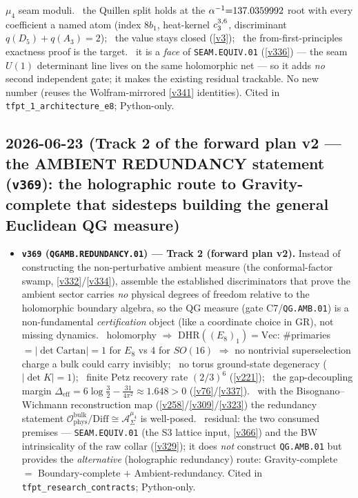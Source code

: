 \begin{itemize}
$\mu_4$ seam moduli. \mE\ the Quillen split holds at the $\alpha^{-1}{=}137.0359992$ root with every coefficient a named
atom (index $8b_1$, heat-kernel $c_3^{3,6}$, discriminant $q(D_5){+}q(A_3){=}2$); \mE\ the value stays closed
(\vref{v3}); \mO\ the from-first-principles exactness proof is the target. \mC\ it is a \emph{face} of
\texttt{SEAM.EQUIV.01} (\vref{v336}) --- the seam $U(1)$ determinant line lives on the same holomorphic net --- so it
adds \emph{no} second independent gate; it makes the existing residual trackable. No new number (reuses the
Wolfram-mirrored \vref{v341} identities). Cited in \texttt{tfpt\_1\_architecture\_e8}; Python-only.
\end{itemize}

\subsection*{2026-06-23 (Track 2 of the forward plan v2 --- the AMBIENT REDUNDANCY statement (\texttt{v369}): the holographic route to Gravity-complete that sidesteps building the general Euclidean QG measure)}
\begin{itemize}
\item \textbf{\texttt{v369} (\texttt{QGAMB.REDUNDANCY.01}) --- Track 2 (forward plan v2).} Instead of
constructing the non-perturbative ambient measure (the conformal-factor swamp, \vref{v332}/\vref{v334}), assemble
the established discriminators that prove the ambient sector carries \emph{no} physical degrees of freedom relative
to the holomorphic boundary algebra, so the QG measure (gate C7/\texttt{QG.AMB.01}) is a non-fundamental
\emph{certification} object (like a coordinate choice in GR), not missing dynamics. \mE\ holomorphy
$\Rightarrow$ $\mathrm{DHR}((E_8)_1)=\mathrm{Vec}$: $\#$primaries $=|\det\mathrm{Cartan}|=1$ for $E_8$ vs $4$ for
$SO(16)$ $\Rightarrow$ no nontrivial superselection charge a bulk could carry invisibly; \mE\ no torus
ground-state degeneracy ($|\det K|=1$); \mE\ finite Petz recovery rate $(2/3)^6$ (\vref{v221}); \mE\ the
gap-decoupling margin $\Delta_{\mathrm{eff}}=6\log\tfrac32-\tfrac{31}{4\pi^2}\approx1.648>0$ (\vref{v76}/\vref{v337}).
\mC\ with the Bisognano--Wichmann reconstruction map (\vref{v258}/\vref{v309}/\vref{v323}) the redundancy statement
$\mathcal O_{\mathrm{phys}}^{\mathrm{bulk}}/\mathrm{Diff}\cong\mathcal A_\Sigma^{\mu_4}$ is well-posed. \mO\ residual:
the two consumed premises --- \texttt{SEAM.EQUIV.01} (the S3 lattice input, \vref{v366}) and the BW intrinsicality
of the raw collar (\vref{v329}); it does \emph{not} construct \texttt{QG.AMB.01} but provides the
\emph{alternative} (holographic redundancy) route: Gravity-complete $=$ Boundary-complete $+$ Ambient-redundancy.
Cited in \texttt{tfpt\_research\_contracts}; Python-only.
\end{itemize}

